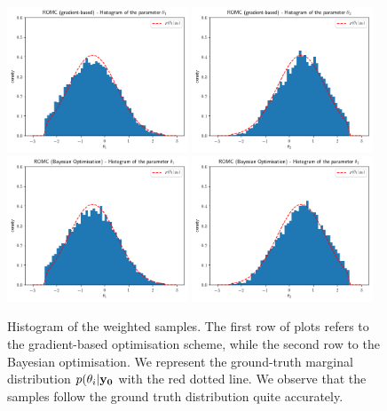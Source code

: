 \begin{figure}[ht]
    \begin{center}
      \includegraphics[width=0.48\textwidth]{./Thesis/images/chapter4/ex2D_hist_t1_romc.png}
      \includegraphics[width=0.48\textwidth]{./Thesis/images/chapter4/ex2D_hist_t2_romc.png}\\
      \includegraphics[width=0.48\textwidth]{./Thesis/images/chapter4/ex2D_hist_t1_romc_bo.png}
      \includegraphics[width=0.48\textwidth]{./Thesis/images/chapter4/ex2D_hist_t2_romc_bo.png}\\
    \end{center}
    \caption[2D example, histogram of the weighted samples.]{Histogram of the weighted samples. The first row of plots
      refers to the gradient-based optimisation scheme, while the
      second row to the Bayesian optimisation. We represent the
      ground-truth marginal distribution $p(\theta_i|\mathbf{y_0}$ with the
      red dotted line. We observe that the samples follow the ground
      truth distribution quite accurately.}
  \label{fig:ex2_3}
\end{figure}

